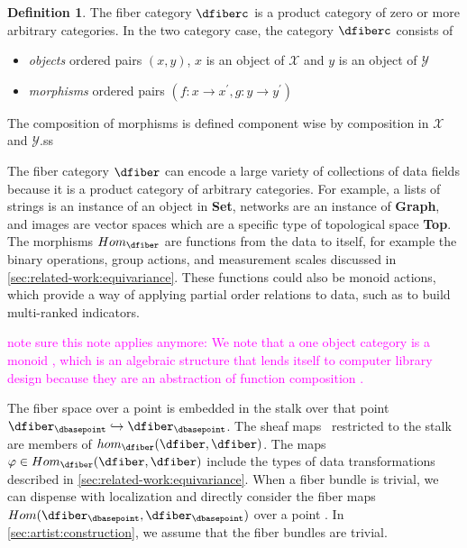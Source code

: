 \documentclass[10pt,journal,compsoc]{IEEEtran}
\newcommand{\note}[1]{\textcolor{magenta}{#1}}
\theoremstyle{definition}
\newtheorem{definition}{Definition}[section]
\theoremstyle{remark}
\begin{document}
\begin{definition} 
  \label{def:category:F} 
  The fiber category $\mathcal{\dfiberc}$ is a product category\cite{maclaneCategoriesWorkingMathematician2013,nlab:product_category} of zero or more arbitrary categories. In the two category case, the category $\mathcal{\dfiberc}$ consists of 
  \begin{itemize}
    \item \textit{objects} ordered pairs $(x,y)$,  $x$ is an object of $\mathcal{X}$ and  $y$ is an object of $\mathcal{Y}$
    \item \textit{morphisms} ordered pairs $(f:x\rightarrow x^{\prime}, g:y\rightarrow y^{\prime})$
    \end{itemize}
The composition of morphisms is defined component wise by composition in $\mathcal{X}$ and $\mathcal{Y}$.ss
\end{definition}
The fiber category $\mathcal{\dfiber}$ can encode a large variety of collections of data fields because it is a product category of arbitrary categories. For example, a lists of strings is an instance of an object in \textbf{Set}, networks are an instance of \textbf{Graph}, and images are vector spaces which are a specific type of topological space \textbf{Top}.  The morphisms $Hom_{\mathcal{\dfiber}}$ are functions from the data to itself, for example the binary operations, group actions, and measurement scales discussed in \autoref{sec:related-work:equivariance}. These functions could also be monoid actions\cite{barrCategoryTheoryComputing}, which provide a way of applying partial order relations to data\cite{fongInvitationAppliedCategory2019}, such as to build multi-ranked indicators\cite{bruggemannRankingPrioritizationMultiindicator2011}.

\note{note sure this note applies anymore: We note that a one object category is a monoid \cite{nlab:monoid,barrCategoryTheoryComputing}, which is an algebraic structure that lends itself to computer library design because they are an abstraction of function composition \cite{yorgeyMonoidsThemeVariations}.}

The fiber space over a point is embedded in the stalk over that point $\dfiber_{\dbasepoint}\hookrightarrow \mathscr{\dfiber}_{\dbasepoint}$. The sheaf maps \dfunc\ restricted to the stalk are members of $hom_{\mathcal{\dfiber}}(\dfiber,\dfiber)$. The maps $\varphi \in Hom_{\mathcal{\dfiber}}(\dfiber,\dfiber)$ include the types of data transformations described in \autoref{sec:related-work:equivariance}. When a fiber bundle is trivial, we can dispense with localization and directly consider the fiber maps $Hom(\dfiber_{\dbasepoint}, \dfiber_{\dbasepoint})$ over a point \dbasepoint. In \autoref{sec:artist:construction}, we assume that the fiber bundles are trivial.
\end{document}
